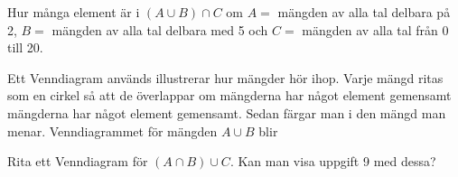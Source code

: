 \begin{problem}[Extra]
	Hur många element är i \((A \cup B) \cap C\) om \(A =\) mängden av alla tal delbara på 2, \(B = \) mängden av alla tal delbara med 5 och \(C =\) mängden av alla tal från 0 till 20.
\end{problem}

\begin{problem}
	Ett Venndiagram används illustrerar hur mängder hör ihop. Varje mängd ritas som en cirkel så att de överlappar om mängderna har något element gemensamt mängderna har något element gemensamt. Sedan färgar man i den mängd man menar. Venndiagrammet för mängden \(A \cup B\) blir
	\def\firstcircle{(0,0) circle (1.5cm)}
	\def\secondcircle{(60:2cm) circle (1.5cm)}
	\def\thirdcircle{(0:2cm) circle (1.5cm)}
	\begin{center}
	\end{center}

	\noindent
	Rita ett Venndiagram för \((A \cap B)\cup C\). Kan man visa uppgift 9 med dessa?
\end{problem}

